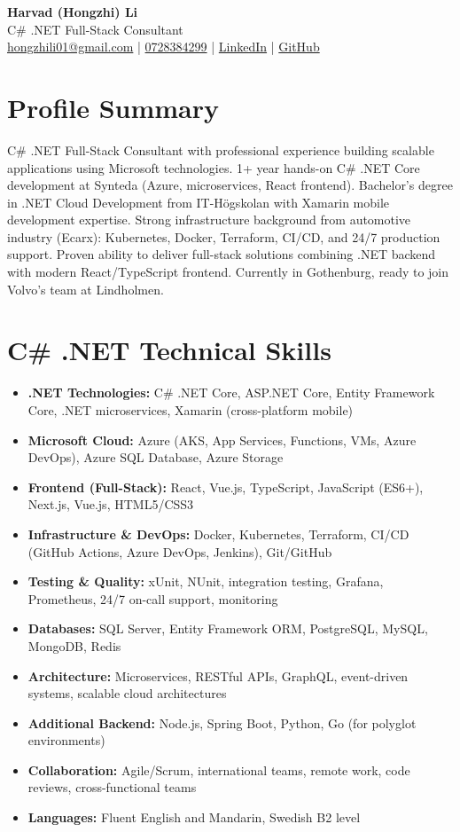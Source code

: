 \documentclass[11pt,a4paper]{article}
\begin{document}
\pagestyle{empty}

\begin{center}
{\LARGE \textbf{Harvad (Hongzhi) Li}}\\[10pt]
{\Large C\# .NET Full-Stack Consultant}\\[10pt]
\textcolor{linkedinblue}{\href{mailto:hongzhili01@gmail.com}{hongzhili01@gmail.com} | \href{tel:0728384299}{0728384299} | \href{https://www.linkedin.com/in/harvad/}{LinkedIn} | \href{https://github.com/bluehawana}{GitHub}}
\end{center}

\section*{Profile Summary}

C\# .NET Full-Stack Consultant with professional experience building scalable applications using Microsoft technologies. 1+ year hands-on C\# .NET Core development at Synteda (Azure, microservices, React frontend). Bachelor's degree in .NET Cloud Development from IT-Högskolan with Xamarin mobile development expertise. Strong infrastructure background from automotive industry (Ecarx): Kubernetes, Docker, Terraform, CI/CD, and 24/7 production support. Proven ability to deliver full-stack solutions combining .NET backend with modern React/TypeScript frontend. Currently in Gothenburg, ready to join Volvo's team at Lindholmen.

\section*{C\# .NET Technical Skills}
\begin{itemize}[leftmargin=*, itemsep=2pt]
\item \textbf{.NET Technologies:} C\# .NET Core, ASP.NET Core, Entity Framework Core, .NET microservices, Xamarin (cross-platform mobile)
\item \textbf{Microsoft Cloud:} Azure (AKS, App Services, Functions, VMs, Azure DevOps), Azure SQL Database, Azure Storage
\item \textbf{Frontend (Full-Stack):} React, Vue.js, TypeScript, JavaScript (ES6+), Next.js, Vue.js, HTML5/CSS3
\item \textbf{Infrastructure \& DevOps:} Docker, Kubernetes, Terraform, CI/CD (GitHub Actions, Azure DevOps, Jenkins), Git/GitHub
\item \textbf{Testing \& Quality:} xUnit, NUnit, integration testing, Grafana, Prometheus, 24/7 on-call support, monitoring
\item \textbf{Databases:} SQL Server, Entity Framework ORM, PostgreSQL, MySQL, MongoDB, Redis
\item \textbf{Architecture:} Microservices, RESTful APIs, GraphQL, event-driven systems, scalable cloud architectures
\item \textbf{Additional Backend:} Node.js, Spring Boot, Python, Go (for polyglot environments)
\item \textbf{Collaboration:} Agile/Scrum, international teams, remote work, code reviews, cross-functional teams
\item \textbf{Languages:} Fluent English and Mandarin, Swedish B2 level
\end{itemize}
\end{document}
